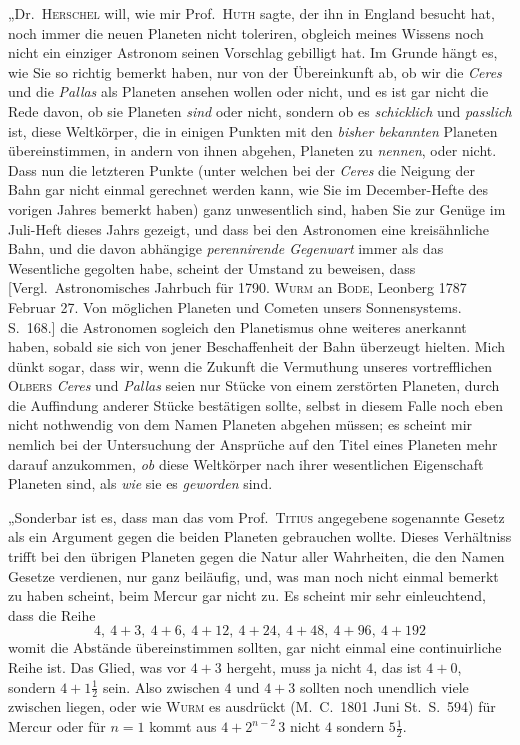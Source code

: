 „Dr.\ \textsc{Herschel} will, wie mir Prof.\ \textsc{Huth} sagte, der ihn in England besucht hat, noch immer die neuen Planeten nicht toleriren, obgleich meines Wissens noch nicht ein einziger Astronom seinen Vorschlag gebilligt hat. Im Grunde hängt es, wie Sie so richtig bemerkt haben, nur von der Übereinkunft ab, ob wir die \textit{Ceres} und die \textit{Pallas} als Planeten ansehen wollen oder nicht, und es ist gar nicht die Rede davon, ob sie Planeten \textit{sind} oder nicht, sondern ob es \textit{schicklich} und \textit{passlich} ist, diese Weltkörper, die in einigen Punkten mit den \textit{bisher bekannten} Planeten übereinstimmen, in andern von ihnen abgehen, Planeten zu \textit{nennen}, oder nicht. Dass nun die letzteren Punkte (unter welchen bei der \textit{Ceres} die Neigung der Bahn gar nicht einmal gerechnet werden kann, wie Sie im December-Hefte des vorigen Jahres bemerkt haben) ganz unwesentlich sind, haben Sie zur Genüge im Juli-Heft dieses Jahrs gezeigt, und dass bei den Astronomen eine kreisähnliche Bahn, und die davon abhängige \textit{perennirende Gegenwart} immer als das Wesentliche gegolten habe, scheint der Umstand zu beweisen, dass
\expandafter\def\csname HistoricalNoteText23\endcsname{[Vergl.\ Astronomisches Jahrbuch für 1790. \textsc{Wurm} an \textsc{Bode}, Leonberg 1787 Februar 27. Von möglichen Planeten und Cometen unsers Sonnensystems. S.\ 168.]}
%
die Astronomen sogleich den Planetismus ohne weiteres anerkannt haben, sobald sie sich von jener Beschaffenheit der Bahn überzeugt hielten. Mich dünkt sogar, dass wir, wenn die Zukunft die Vermuthung unseres vortrefflichen \textsc{Olbers} \textit{Ceres} und \textit{Pallas} seien nur Stücke von einem zerstörten Planeten, durch die Auffindung anderer Stücke bestätigen sollte, selbst in diesem Falle noch eben nicht nothwendig von dem Namen Planeten abgehen müssen; es scheint mir nemlich bei der Untersuchung der Ansprüche auf den Titel eines Planeten mehr darauf anzukommen, \textit{ob} diese Weltkörper nach ihrer wesentlichen Eigenschaft Planeten sind, als \textit{wie} sie es \textit{geworden} sind.

„Sonderbar ist es, dass man das vom Prof.\ \textsc{Titius} angegebene sogenannte Gesetz als ein Argument gegen die beiden Planeten gebrauchen wollte. Dieses Verhältniss trifft bei den übrigen Planeten gegen die Natur aller Wahrheiten, die den Namen Gesetze verdienen, nur ganz beiläufig, und, was man noch nicht einmal bemerkt zu haben scheint, beim Mercur gar nicht zu. Es scheint mir sehr einleuchtend, dass die Reihe
\[
4,\ 4+3,\ 4+6,\ 4+12,\ 4+24,\ 4+48,\ 4+96,\ 4+192
\]
womit die Abstände übereinstimmen sollten, gar nicht einmal eine continuirliche Reihe ist. Das Glied, was vor $4+3$ hergeht, muss ja nicht $4$, das ist $4+0$, sondern $4+1\frac12$ sein. Also zwischen $4$ und $4+3$ sollten noch unendlich viele zwischen liegen, oder wie \textsc{Wurm} es ausdrückt (M.\ C.\ 1801 Juni St.\ S.\ 594) für Mercur oder für $n=1$ kommt aus $4+2^{n-2}\,3$ nicht $4$ sondern $5\frac12$.

